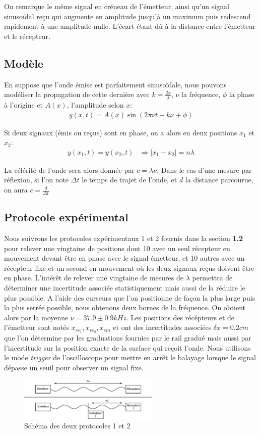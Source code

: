 \documentclass[12pt]{article}
\begin{document}
On remarque le même signal en créneau de l'émetteur, ainsi qu'un signal sinusoïdal reçu qui augmente en amplitude jusqu'à un maximum puis redescend rapidement à une amplitude nulle. L'écart étant dû à la distance entre l'émetteur et le récepteur.

\subsection{Modèle}
En suppose que l'onde émise est parfaitement sinusoïdale, nous pouvons modéliser la propagation de cette dernière avec $k=\frac{2\pi}{\lambda}$, $\nu$ la fréquence, $\phi$ la phase à l'origine et $A(x)$, l'amplitude selon $x$:
\begin{align}
	y(x, t) = A(x) \sin(2\pi\nu t - kx + \phi)
\end{align}

Si deux signaux (émis ou reçus) sont en phase, on a alors en deux positions $x_1$ et $x_2$:
\begin{align*}
	y(x_1, t) = y(x_2, t) & \Rightarrow |x_1 - x_2| = n\lambda
\end{align*}

La célérité de l'onde sera alors donnée par $c = \lambda \nu$. Dans le cas d'une mesure par réflexion, si l'on note $\Delta t$ le temps de trajet de l'onde, et $d$ la distance parcourue, on aura $c = \frac{d}{\Delta t}$

\subsection{Protocole expérimental}
Nous suivrons les protocoles expérimentaux 1 et 2 fournis dans la section \textbf{1.2} pour relever une vingtaine de positions dont 10 avec un seul récepteur en mouvement devant être en phase avec le signal émetteur, et 10 autres
avec un récepteur fixe et un second en mouvement où les deux signaux reçus doivent être en phase. L'intérêt de relever une vingtaine de mesures de $\lambda$ permettra de déterminer une incertitude associée statistiquement mais aussi de la réduire le plus possible. A l'aide des curseurs que l'on positionne de façon la plus large puis la plus serrée possible, nous obtenons deux bornes de la fréquence.
On obtient alors par la moyenne $\nu = 37.9 \pm 0.9 kHz$. Les positions des récépteurs et de l'émetteur sont notés $x_{re_1}, x_{re_2}, x_{em}$ et ont des incertitudes associées
$\delta x = 0.2cm$ que l'on détermine par les graduations fournies par le rail gradué mais aussi par l'incertitude sur la position exacte de la surface qui reçoit l'onde. 
Nous utilisons le mode \textit{trigger} de l'oscilloscope pour mettre en arrêt le balayage lorsque le signal dépasse un seuil pour observer un signal fixe.
\begin{figure}[!htbp]
	\centering
	\includegraphics[width=0.6\textwidth]{img/schema}
	\hfill
	\caption{Schéma des deux protocoles 1 et 2}
\end{figure}
\end{document}
